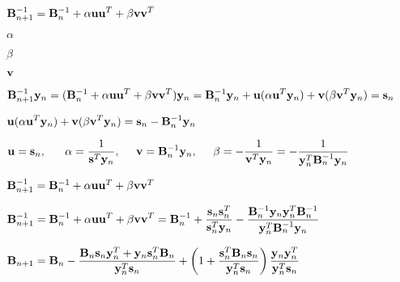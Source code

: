 \documentclass{article}
\def\lthtmlcheckvsize{\ifdim\ht\sizebox<\vsize 
  \ifdim\wd\sizebox<\hsize\expandafter\hfill\fi \expandafter\vfill
  \else\expandafter\vss\fi}%
\begin{document}
{\newpage\clearpage
{}%
$\displaystyle {\bf B}^{-1}_{n+1}={\bf B}_n^{-1}+\alpha{\bf uu}^T+\beta{\bf vv}^T$%
\lthtmlindisplaymathZ
\lthtmlcheckvsize\clearpage}

{\newpage\clearpage
{}%
$ \alpha$%
\lthtmlindisplaymathZ
\lthtmlcheckvsize\clearpage}

{\newpage\clearpage
{}%
$ \beta$%
\lthtmlindisplaymathZ
\lthtmlcheckvsize\clearpage}

{\newpage\clearpage
{}%
$ {\bf v}$%
\lthtmlindisplaymathZ
\lthtmlcheckvsize\clearpage}

{\newpage\clearpage
{}%
$\displaystyle {\bf B}_{n+1}^{-1} {\bf y}_n
=({\bf B}_n^{-1}+\alpha{\bf uu}^T+\beta{\bf vv}^T){\bf y}_n
={\bf B}_n^{-1}{\bf y}_n+{\bf u}(\alpha{\bf u}^T{\bf y}_n)
+{\bf v}(\beta{\bf v}^T{\bf y}_n)={\bf s}_n$%
\lthtmlindisplaymathZ
\lthtmlcheckvsize\clearpage}

{\newpage\clearpage
{}%
$\displaystyle {\bf u}(\alpha{\bf u}^T{\bf y}_n)
+{\bf v}(\beta{\bf v}^T{\bf y}_n)={\bf s}_n-{\bf B}_n^{-1}{\bf y}_n$%
\lthtmlindisplaymathZ
\lthtmlcheckvsize\clearpage}

{\newpage\clearpage
{}%
$\displaystyle {\bf u}={\bf s}_n,\;\;\;\;\;\;\alpha=\frac{1}{{\bf s}^T{\bf y}_n},
\;\;\;\;\;{\bf v}={\bf B}_n^{-1}{\bf y}_n,\;\;\;\;\;
\beta=-\frac{1}{{\bf v}^T{\bf y}_n}=-\frac{1}{{\bf y}_n^T{\bf B}_n^{-1}{\bf y}_n}$%
\lthtmlindisplaymathZ
\lthtmlcheckvsize\clearpage}

{\newpage\clearpage
{}%
$ {\bf B}^{-1}_{n+1}={\bf B}^{-1}_n+\alpha{\bf uu}^T+\beta{\bf vv}^T$%
\lthtmlindisplaymathZ
\lthtmlcheckvsize\clearpage}

{\newpage\clearpage
{}%
$\displaystyle {\bf B}^{-1}_{n+1}={\bf B}^{-1}_n+\alpha{\bf uu}^T+\beta{\bf vv}^T
={\bf B}^{-1}_n+\frac{{\bf s}_n{\bf s}_n^T}{{\bf s}_n^T{\bf y}_n}
-\frac{{\bf B}_n^{-1}{\bf y}_n{\bf y}_n^T{\bf B}_n^{-1}}{{\bf y}_n^T{\bf B}_n^{-1}{\bf y}_n}$%
\lthtmlindisplaymathZ
\lthtmlcheckvsize\clearpage}

{\newpage\clearpage
{}%
$\displaystyle {\bf B}_{n+1}=
{\bf B}_n-\frac{{\bf B}_n{\bf s}_n{\bf y}_n^T+{\bf y}_n{\bf s}_n^T{\bf B}_n}{{\bf y}_n^T{\bf s}_n}
+\left(1+\frac{{\bf s}^T_n{\bf B}_n{\bf s}_n}{{\bf y}_n^T{\bf s}_n}\right)
\frac{{\bf y}_n{\bf y}_n^T}{{\bf y}_n^T{\bf s}_n}$%
\lthtmlindisplaymathZ
\lthtmlcheckvsize\clearpage}
\end{document}

